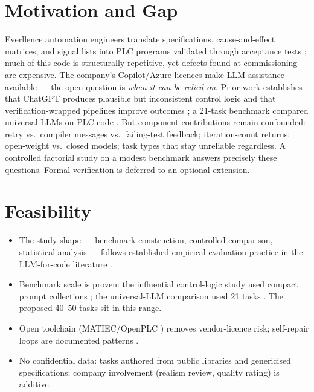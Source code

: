 \documentclass[10pt,a4paper]{article}
\begin{document}
\section{Motivation and Gap}

Everllence automation engineers translate specifications, cause-and-effect matrices, and signal lists into PLC programs validated through acceptance tests \cite{everllence2025}; much of this code is structurally repetitive, yet defects found at commissioning are expensive. The company's Copilot/Azure licences make LLM assistance available --- the open question is \emph{when it can be relied on}. Prior work establishes that ChatGPT produces plausible but inconsistent control logic \cite{koziolek2023chatgpt} and that verification-wrapped pipelines improve outcomes \cite{fakih2024llm4plc, liu2024agents4plc}; a 21-task benchmark compared universal LLMs on PLC code \cite{universalplc2024}. But component contributions remain confounded: retry vs.\ compiler messages vs.\ failing-test feedback; iteration-count returns; open-weight vs.\ closed models; task types that stay unreliable regardless. A controlled factorial study on a modest benchmark answers precisely these questions. Formal verification \cite{darvas2016plcverif} is deferred to an optional extension.

\section{Feasibility}

\begin{itemize}
    \item The study shape --- benchmark construction, controlled comparison, statistical analysis --- follows established empirical evaluation practice in the LLM-for-code literature \cite{koziolek2023chatgpt, universalplc2024}.
    \item Benchmark scale is proven: the influential control-logic study used compact prompt collections \cite{koziolek2023chatgpt}; the universal-LLM comparison used 21 tasks \cite{universalplc2024}. The proposed 40--50 tasks sit in this range.
    \item Open toolchain (MATIEC/OpenPLC \cite{tisserant2007beremiz}) removes vendor-licence risk; self-repair loops are documented patterns \cite{chen2023selfdebug}.
    \item No confidential data: tasks authored from public libraries \cite{oscat} and genericised specifications; company involvement (realism review, quality rating) is additive.
\end{itemize}
\end{document}
